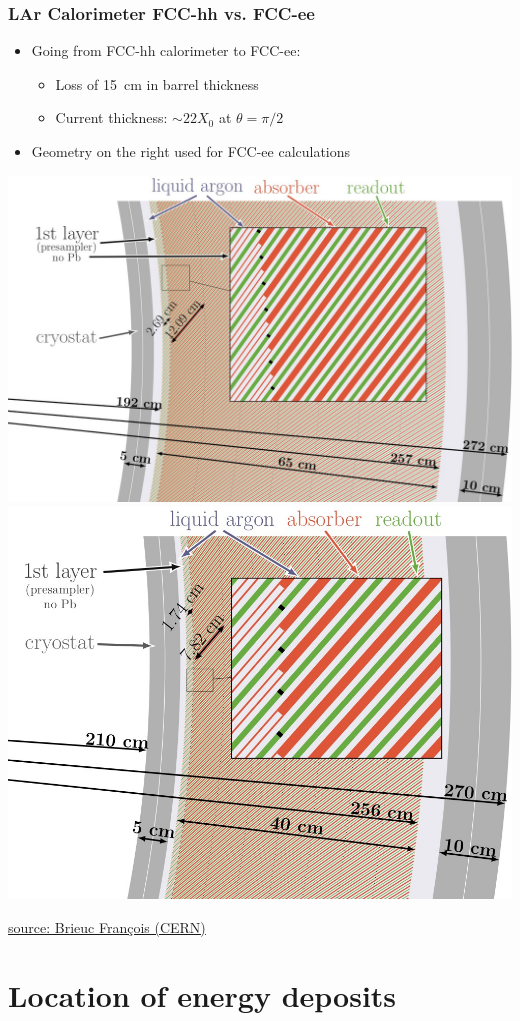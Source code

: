 \documentclass{beamer}
\begin{document}
\begin{frame}
  \frametitle{LAr Calorimeter FCC-hh vs. FCC-ee}

  \begin{itemize}
    \item Going from FCC-hh calorimeter to FCC-ee:
          \begin{itemize}
            \item Loss of 15~cm in barrel thickness
            \item Current thickness: $\sim 22 X_0$ at $\theta = \pi/2$
          \end{itemize}
    \item Geometry on the right used for FCC-ee calculations
  \end{itemize}


  \includegraphics[width=0.49\linewidth]{figures/lar_calo_fcchh.png}
  \includegraphics[width=0.49\linewidth]{figures/lar_calo_fccee.png}

  {\tiny
   \href{https://indico.cern.ch/event/969249/contributions/4086276/attachments/2132741/3591642/20201029_LAr_workingMeeting_Brieuc.pdf}
        {source: Brieuc François (CERN)}}
\end{frame}


\section{Location of energy deposits}
\end{document}
